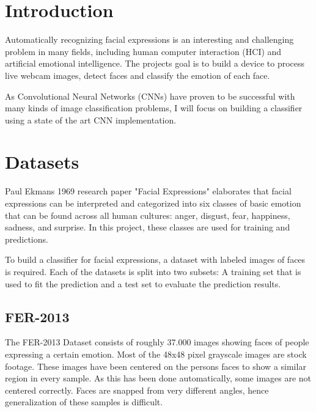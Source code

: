 \documentclass[twoside]{article}
\begin{document}
\begin{multicols}{2} %

\section{Introduction}

Automatically recognizing facial expressions is an interesting and challenging problem in many fields, including human computer interaction (HCI) and artificial emotional intelligence. The projects goal is to build a device to process live webcam images, detect faces and classify the emotion of each face.

As Convolutional Neural Networks (CNNs) have proven to be successful with many kinds of image classification  problems, I will focus on building a classifier using a state of the art CNN implementation.


\section{Datasets}

Paul Ekmans 1969 research paper "Facial Expressions" elaborates that facial expressions can be interpreted and categorized into six classes of basic emotion that can be found across all human cultures: anger, disgust, fear, happiness, sadness, and surprise. In this project, these classes are used for training and predictions.

To build a classifier for facial expressions, a dataset with labeled images of faces is required. Each of the datasets is split into two subsets: A training set that is used to fit the prediction and a test set to evaluate the prediction results.

\subsection{FER-2013}

The FER-2013 Dataset consists of roughly 37.000 images showing faces of people expressing a certain emotion. Most of the 48x48 pixel grayscale images are stock footage. These images have been centered on the persons faces to show a similar region in every sample. As this has been done automatically, some images are not centered correctly. Faces are snapped from very different angles, hence generalization of these samples is difficult.




\end{multicols}
\end{document}
